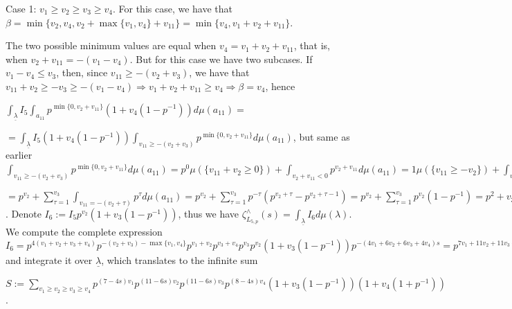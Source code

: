 \documentclass{article}
\begin{document}
Case 1: $v_{1}\geq{v_{2}}\geq{v_{3}}\geq{v_{4}}$.
For this case, we have that $\beta=\min\{v_{2},v_{4},v_{2}+\max\{v_{1},v_{4}\}+v_{11}\}=\min\{v_{4},v_{1}+v_{2}+v_{11}\}$.

The two possible minimum values are equal when $v_{4}=v_{1}+v_{2}+v_{11}$, that is, when $v_{2}+v_{11}=-(v_{1}-v_{4})$. But for this case we have two subcases. If $v_{1}-v_{4}\leq{v_{3}}$, then, since $v_{11}\geq{-(v_{2}+v_{3})}$, we have that $v_{11}+v_{2}\geq{-v_{3}}\geq{-(v_{1}-v_{4})}\Rightarrow{v_{1}+v_{2}+v_{11}\geq{v_{4}}}\Rightarrow{\beta=v_{4}}$, hence 

$\displaystyle\int_{\underline{\lambda}}I_{5}\int_{a_{11}}p^{\min\{0,v_{2}+v_{11}\}}(1+v_{4}(1-p^{-1}))d\mu(a_{11})=$

$=\displaystyle\int_{\underline{\lambda}}I_{5}(1+v_{4}(1-p^{-1}))\int_{v_{11}\geq{-(v_{2}+v_{3})}}p^{\min\{0,v_{2}+v_{11}\}}d\mu(a_{11})$, but same as earlier $\displaystyle\int_{v_{11}\geq{-(v_{2}+v_{3})}}p^{\min\{0,v_{2}+v_{11}\}}d\mu(a_{11})=p^{0}\mu(\{v_{11}+v_{2}\geq{0}\})+\displaystyle\int_{{v_{2}+v_{11}}<{0}}p^{v_{2}+v_{11}}d\mu(a_{11})=1\mu(\{v_{11}\geq{-v_{2}}\})+\displaystyle\int_{{v_{2}+v_{11}}<{0}}p^{v_{2}+v_{11}}d\mu(a_{11})=p^{v_{2}}+\displaystyle\int_{-v_{3}\leq{v_{11}}<-v_{2}}p^{v_{2}+v_{11}}d\mu(a_{11})=p^{v_{2}}+\sum_{\tau=-v_{3}}^{-(v_{2}+1)}\displaystyle\int_{v_{11}=\tau}p^{v_{2}+\tau}d\mu(a_{11})=$

$=p^{v_{2}}+\sum_{\tau=1}^{v_{3}}\displaystyle\int_{v_{11}=-(v_{2}+\tau)}p^{\tau}d\mu(a_{11})=p^{v_{2}}+\sum_{\tau=1}^{v_{3}}p^{-\tau}(p^{v_{2}+\tau}-p^{v_{2}+\tau-1})=p^{v_{2}}+\sum_{\tau=1}^{v_{3}}p^{v_{2}}(1-p^{-1})=p^{2}+v_{3}=p^{v_{2}}(1+v_{3}(1-p^{-1}))$. Denote $I_{6}:=I_{5}p^{v_{2}}(1+v_{3}(1-p^{-1}))$, thus we have $\zeta_{L_{5,p}}^{\wedge}(s)=\displaystyle\int_{\underline{\lambda}}I_{6}d\mu(\lambda)$. We compute the complete expression $I_{6}=p^{4(v_{1}+v_{2}+v_{3}+v_{4})}p^{-(v_{2}+v_{3})-\max\{v_{1},v_{4}\}}p^{v_{1}+v_{2}}p^{v_{3}+v_{4}}p^{v_{3}}p^{v_{2}}(1+v_{3}(1-p^{-1}))p^{-(4v_{1}+6v_{2}+6v_{3}+4v_{4})s}=p^{7v_{1}+11v_{2}+11v_{3}+8v_{4}}(1+v_{3}(1-p^{-1}))(1+v_{4}(1+p^{-1}))p^{-(4v_{1}+6v_{2}+6v_{3}+4v_{4})s}=p^{(7-4s)v_{1}}p^{(11-6s)v_{2}}p^{(11-6s)v_{3}}p^{(8-4s)v_{4}}(1+v_{3}(1-p^{-1}))(1+v_{4}(1-p^{-1}))$ and integrate it over $\underline{\lambda}$, which translates to the infinite sum 

$S:=\sum_{v_{1}\geq{v_{2}\geq{v_{3}}\geq{v_{4}}}}p^{(7-4s)v_{1}}p^{(11-6s)v_{2}}p^{(11-6s)v_{3}}p^{(8-4s)v_{4}}(1+v_{3}(1-p^{-1}))(1+v_{4}(1+p^{-1}))$.
\end{document}
